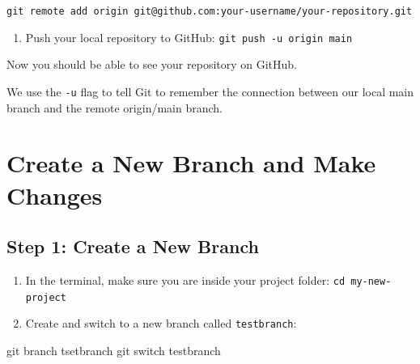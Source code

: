 \documentclass[
  11pt,
  letterpaper,
  DIV=11,
  numbers=noendperiod]{scrartcl}
\newenvironment{Shaded}{\begin{snugshade}}{\end{snugshade}}
\newcommand{\FunctionTok}[1]{\textcolor[rgb]{0.28,0.35,0.67}{#1}}
\newcommand{\NormalTok}[1]{\textcolor[rgb]{0.00,0.23,0.31}{#1}}
\providecommand{\tightlist}{%
  \setlength{\itemsep}{0pt}\setlength{\parskip}{0pt}}\usepackage{longtable,booktabs,array}
\let\textttOrig\texttt
\renewcommand{\texttt}[1]{\textttOrig{\colorbox{codebggray}{\textcolor{codefontcolor}{#1}}}}
\begin{document}
\texttt{git\ remote\ add\ origin\ git@github.com:your-username/your-repository.git}

\begin{enumerate}
\def\labelenumi{\arabic{enumi}.}
\setcounter{enumi}{3}
\tightlist
\item
  Push your local repository to GitHub:
  \texttt{git\ push\ -u\ origin\ main}
\end{enumerate}

Now you should be able to see your repository on GitHub.

\begin{tcolorbox}[enhanced jigsaw, colback=white, colframe=quarto-callout-tip-color-frame, bottomtitle=1mm, titlerule=0mm, toptitle=1mm, breakable, opacitybacktitle=0.6, opacityback=0, leftrule=.75mm, colbacktitle=quarto-callout-tip-color!10!white, title=\textcolor{quarto-callout-tip-color}{\faLightbulb}\hspace{0.5em}{Tip}, arc=.35mm, coltitle=black, toprule=.15mm, rightrule=.15mm, bottomrule=.15mm, left=2mm]

We use the \texttt{-u} flag to tell Git to remember the connection
between our local main branch and the remote origin/main branch.

\end{tcolorbox}

\section{Create a New Branch and Make
Changes}\label{create-a-new-branch-and-make-changes}

\subsection{Step 1: Create a New
Branch}\label{step-1-create-a-new-branch}

\begin{enumerate}
\def\labelenumi{\arabic{enumi}.}
\tightlist
\item
  In the terminal, make sure you are inside your project folder:
  \texttt{cd\ my-new-project}
\item
  Create and switch to a new branch called \texttt{testbranch}:
\end{enumerate}

\begin{Shaded}
\begin{Highlighting}[]
\FunctionTok{git}\NormalTok{ branch tsetbranch}
\FunctionTok{git}\NormalTok{ switch testbranch}
\end{Highlighting}
\end{Shaded}
\end{document}
